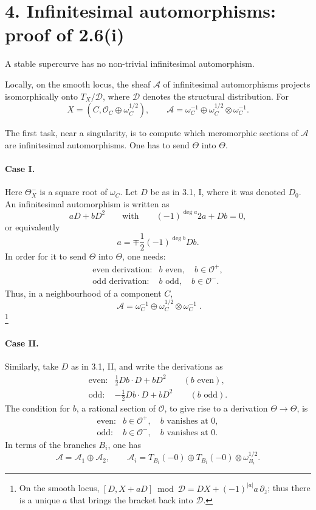 \documentclass[11pt]{article}
\newcommand{\OO}{\mathcal O}
\newcommand{\cA}{\mathcal A}
\newcommand{\cD}{\mathcal D}
\newcommand{\TT}{\Theta}
\newcommand{\om}{\omega}
\begin{document}
\section*{4. Infinitesimal automorphisms: proof of 2.6(i)}

A stable supercurve has no non-trivial infinitesimal automorphism.

Locally, on the smooth locus, the sheaf \(\cA\) of infinitesimal automorphisms projects isomorphically onto \(T_X/\cD\), where \(\cD\) denotes the structural distribution. For
\[
  X=(C,\OO_C\oplus \om_C^{1/2}),
  \qquad
  \cA=\omega_C^{-1}\oplus \omega_C^{1/2}\otimes\omega_C^{-1}.
\]

The first task, near a singularity, is to compute which meromorphic sections of \(\cA\) are infinitesimal automorphisms. One has to send \(\TT\) into \(\TT\).

\paragraph{Case I.}
Here \(\TT_X^{-}\) is a square root of \(\omega_C\). Let \(D\) be as in 3.1, I, where it was denoted \(D_0\). An infinitesimal automorphism is written as
\[
  aD+bD^2
  \qquad\text{with}\qquad
  (-1)^{\deg a}2a+Db=0,
\]
or equivalently
\[
  a=\mp\frac12(-1)^{\deg b}Db.
\]
In order for it to send \(\TT\) into \(\TT\), one needs:
\[
\begin{array}{ll}
\text{even derivation}:& b\text{ even},\quad b\in\OO^{+},\\[1mm]
\text{odd derivation}:& b\text{ odd},\quad b\in\OO^{-}.
\end{array}
\]
Thus, in a neighbourhood of a component \(C\),
\[
  \boxed{\;\cA=\omega_C^{-1}\oplus \omega_C^{1/2}\otimes\omega_C^{-1}\; }.
\]
\footnote{On the smooth locus, \([D,X+aD]\bmod \cD=DX+(-1)^{|a|}a\,\partial_z\); thus there is a unique \(a\) that brings the bracket back into \(\cD\).}

\paragraph{Case II.}
Similarly, take \(D\) as in 3.1, II, and write the derivations as
\[
\begin{array}{ll}
\text{even}:&\displaystyle \frac12Db\cdot D+bD^2\qquad (b\text{ even}),\\[3mm]
\text{odd}:&\displaystyle -\frac12Db\cdot D+bD^2\qquad (b\text{ odd}).
\end{array}
\]
The condition for \(b\), a rational section of \(\OO\), to give rise to a derivation \(\TT\to\TT\), is
\[
\begin{array}{ll}
\text{even}:& b\in\OO^{+},\quad b\text{ vanishes at }0,\\[1mm]
\text{odd}:& b\in\OO^{-},\quad b\text{ vanishes at }0.
\end{array}
\]
In terms of the branches \(B_i\), one has
\[
  \cA=\cA_1\oplus\cA_2,
  \qquad
  \cA_i=T_{B_i}(-0)\oplus T_{B_i}(-0)\otimes\omega_{B_i}^{1/2}.
\]
\end{document}

